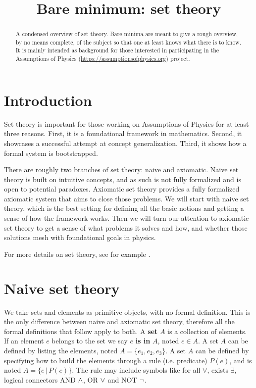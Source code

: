 \documentclass{article}
\title{Bare minimum: set theory}
\date{\vspace{-5ex}}
\begin{document}
\maketitle


\begin{abstract}
A condensed overview of set theory. Bare minima are meant to give a rough overview, by no means complete, of the subject so that one at least knows what there is to know. It is mainly intended as background for those interested in participating in the Assumptions of Physics (\url{https://assumptionsofphysics.org}) project.
\end{abstract}


\section{Introduction}

Set theory is important for those working on Assumptions of Physics for at least three reasons. First, it is a foundational framework in mathematics. Second, it showcases a successful attempt at concept generalization. Third, it shows how a formal system is bootstrapped.

There are roughly two branches of set theory: naive and axiomatic. Naive set theory is built on intuitive concepts, and as such is not fully formalized and is open to potential paradoxes. Axiomatic set theory provides a fully formalized axiomatic system that aims to close those problems. We will start with naive set theory, which is the best setting for defining all the basic notions and getting a sense of how the framework works. Then we will turn our attention to axiomatic set theory to get a sense of what problems it solves and how, and whether those solutions mesh with foundational goals in physics.

For more details on set theory, see for example \cite{pinter2014book, settheory-tutorial}.

\section{Naive set theory}

We take sets and elements as primitive objects, with no formal definition. This is the only difference between naive and axiomatic set theory, therefore all the formal definitions that follow apply to both. A \textbf{set} $A$ is a collection of elements. If an element $e$ belongs to the set we say $e$ \textbf{is in} $A$, noted $ e 
\in A$. A set $A$ can be defined by listing the elements, noted $A = \{ e_1, e_2, e_3 \}$. A set $A$ can be defined by specifying how to build the elements through a rule (i.e. predicate) $P(e)$, and is noted $A = \{e \, | \,  P(e) \}$. The rule may include symbols like for all $\forall$, exists $\exists$, logical connectors AND $\wedge$, OR $\vee$ and NOT $\neg$.
\end{document}
